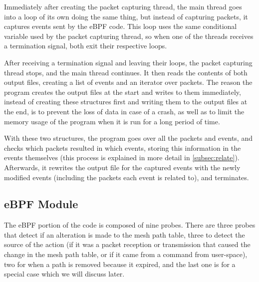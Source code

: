 Immediately after creating the packet capturing thread, the main thread goes
into a loop of its own doing the same thing, but instead of capturing packets,
it captures events sent by the eBPF code. This loop uses the same conditional
variable used by the packet capturing thread, so when one of the threads
receives a termination signal, both exit their respective loops.

After receiving a termination signal and leaving their loops, the packet
capturing thread stops, and the main thread continues. It then reads the
contents of both output files, creating a list of events and an iterator over
packets. The reason the program creates the output files at the start and writes
to them immediately, instead of creating these structures first and writing them
to the output files at the end, is to prevent the loss of data in case of a
crash, as well as to limit the memory usage of the program when it is run for a
long period of time.

With these two structures, the program goes over all the packets and events, and
checks which packets resulted in which events, storing this information in the
events themselves (this process is explained in more detail in
\autoref{subsec:relate}). Afterwards, it rewrites the output file for the
captured events with the newly modified events (including the packets each event
is related to), and terminates.


\subsection{eBPF Module}\label{subsec:ebpfcode}

The eBPF portion of the code is composed of nine probes. There are three probes
that detect if an alteration is made to the mesh path table, three to detect the
source of the action (if it was a packet reception or transmission that caused
the change in the mesh path table, or if it came from a command from
user-space), two for when a path is removed because it expired, and the last one
is for a special case which we will discuss later.

